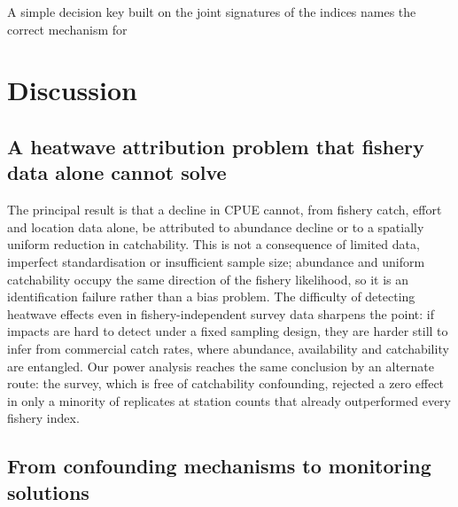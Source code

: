 \documentclass[11pt,a4paper]{article}
\begin{document}
A simple decision key built on the joint signatures of the indices names the correct mechanism for %

\section{Discussion}

\subsection{A heatwave attribution problem that fishery data alone cannot solve}

The principal result is that a decline in CPUE cannot, from fishery catch, effort and location data alone, be attributed to abundance decline or to a spatially uniform reduction in catchability. This is not a consequence of limited data, imperfect standardisation or insufficient sample size; abundance and uniform catchability occupy the same direction of the fishery likelihood, so it is an identification failure rather than a bias problem. The difficulty of detecting heatwave effects even in fishery-independent survey data \citep{fredston2023} sharpens the point: if impacts are hard to detect under a fixed sampling design, they are harder still to infer from commercial catch rates, where abundance, availability and catchability are entangled. Our power analysis reaches the same conclusion by an alternate route: the survey, which is free of catchability confounding, rejected a zero effect in only a minority of replicates at station counts that already outperformed every fishery index.

\subsection{From confounding mechanisms to monitoring solutions}
\end{document}

